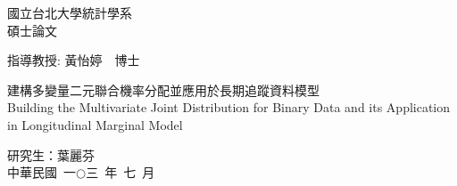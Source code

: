 
\usepackage{wallpaper}                                          %


\fontsize{12}{22pt}\selectfont
 \begin{center}
    \huge 國立台北大學統計學系 \\ 碩士論文
 \end{center}
\vspace*{2cm}
 \begin{center}
    \LARGE 指導教授: 黃怡婷~~博士 \\
 \end{center}
\vspace*{2cm}
 \begin{center}
    \LARGE 建構多變量二元聯合機率分配並應用於長期追蹤資料模型\\
         Building the Multivariate Joint Distribution for Binary Data and its Application in Longitudinal Marginal Model
 \end{center}
\vspace*{5cm}
\begin{center}
    \LARGE 研究生：葉麗芬 \\
    \LARGE 中華民國~一$\bigcirc$三~年~七~月
\end{center}

\newpage

\newpage					
\fontsize{12}{22pt}\selectfont 	%
\fancyfoot[C]{\thepage}

\setcounter{tocdepth}{2}		%
\tableofcontents
\newpage
\renewcommand{\numberline}[1]{\loflabel~#1\hspace*{1em}}%
\listoffigures %
\newpage
\renewcommand{\numberline}[1]{\lotlabel~#1\hspace*{1em}}%
\listoftables %

\cleardoublepage
{}          %
\setcounter{page}{1}
\ifodd{} \else \thispagestyle{empty}\mbox{}\clearpage\fi %
\ifodd{} \else \thispagestyle{empty}\mbox{}\clearpage\fi
\ifodd{} \else \thispagestyle{empty}\mbox{}\clearpage\fi
\ifodd{} \else \thispagestyle{empty}\mbox{}\clearpage\fi

